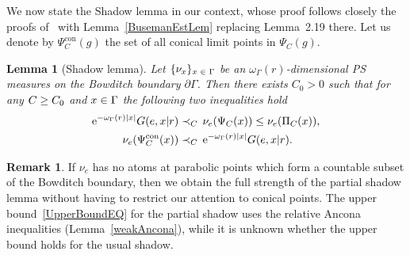 \documentclass[10pt]{amsart}
\newtheorem{lemm}[theo]{Lemma}\newtheorem{prop}[theo]{Proposition}\newtheorem{coro}[theo]{Corollary}\newtheorem{conj}[theo]{Conjecture}
\theoremstyle{definition}\newtheorem{defi}[theo]{Definition}\newtheorem{rema}[theo]{Remark}\newtheorem{exam}[theo]{Example}\newtheorem{exem}[theo]{Example}\newtheorem{nota}[theo]{Notation}
\newcommand{\pG}{\partial{\Gamma}}
\newcommand{\rme}{\mathrm{e}}
\DeclareMathOperator{\con}{con}
\let\oldin\in
\renewcommand{\in}{\mathchoice{\oldin}{\oldin}{\,\oldin\,}{\,\oldin\,}}
\let\oldge\ge
\renewcommand{\ge}{\mathchoice{\oldge}{\oldge}{\,\oldge\,}{\,\oldge\,}}
\let\oldle\le
\renewcommand{\le}{\mathchoice{\oldle}{\oldle}{\,\oldle\,}{\,\oldle\,}}
\begin{document}
We now state the Shadow lemma in our context, whose proof follows closely the proofs of~\cite[Lemmas~4.1 \& 4.2]{YangPS} with Lemma~\ref{BusemanEstLem} replacing Lemma~2.19 there. Let us denote by $\Psi^{\con}_C(g)$ the set of all conical limit points in $\Psi_C(g)$.

\begin{lemm}[Shadow lemma]\label{ShadowLem}
Let $\{\nu_x\}_{x \in \Gamma}$ be an $\omega_\Gamma(r)$-dimensional PS measures on the Bowditch boundary $\pG$. Then there exists $C_0> 0$ such that for any $C\ge C_0$ and $x\in \Gamma$ the following two inequalities hold
\begin{align}
\rme^{-\omega_\Gamma(r) |x|}G(e,x|r) &\prec_C \, \nu_e(\Psi_{C}(x))\le \nu_e(\Pi_{C}(x)),\label{LowBoundEQ}\\
\nu_e(\Psi^{\con}_{C}(x)) &\prec_C \, \rme^{-\omega_\Gamma(r) |x|} G(e,x|r).\label{UpperBoundEQ}
\end{align}
\end{lemm}

\begin{rema}
If $\nu_e$ has no atoms at parabolic points which form a countable subset of the Bowditch boundary, then we obtain the full strength of the partial shadow lemma without having to restrict our attention to conical points. The upper bound~\eqref{UpperBoundEQ} for the partial shadow uses the relative Ancona inequalities (Lemma~\ref{weakAncona}), while it is unknown whether the upper bound holds for the usual shadow.
\end{rema}
\end{document}
